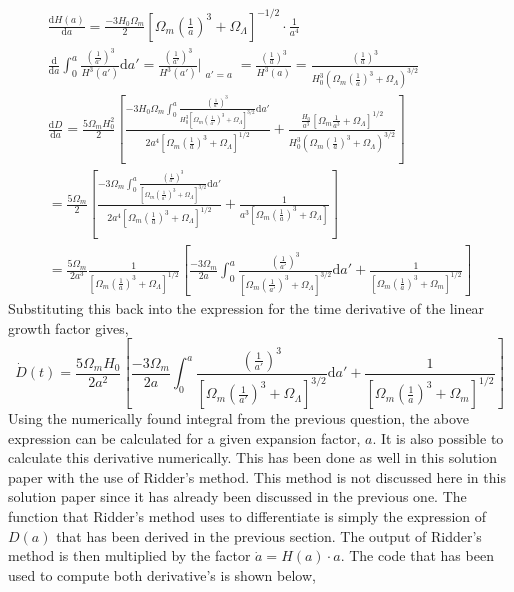 \begin{gather*}
\frac{\mathrm{d}H(a)}{\mathrm{d}a} = \frac{-3H_0\Omega_m}{2}\left[\Omega_m\left(\frac{1}{a}\right)^3+\Omega_{\Lambda}\right]^{-1/2}\cdot\frac{1}{a^4}\\
\frac{\mathrm{d}}{\mathrm{d}a}\int_0^a\frac{\left(\frac{1}{a'}\right)^3}{H^3(a')}\mathrm{d}a' =  \frac{\left(\frac{1}{a'}\right)^3}{H^3(a')}|_{\substack{a'=a}} = \frac{\left(\frac{1}{a}\right)^3}{H^3(a)} = \frac{\left(\frac{1}{a}\right)^3}{H_0^3(\Omega_m\left(\frac{1}{a}\right)^3 + \Omega_{\Lambda})^{3/2}}\\
\frac{\mathrm{d}D}{\mathrm{d}a} = \frac{5\Omega_m H_0^2}{2} \left[\frac{-3H_0\Omega_m\int_0^a\frac{\left(\frac{1}{a'}\right)^3}{H_0^3\left[\Omega_m\left(\frac{1}{a'}\right)^3 + \Omega_{\Lambda}\right]^{3/2}}\mathrm{d}a'}{2a^4\left[\Omega_m\left(\frac{1}{a}\right)^3 +\Omega_{\Lambda}\right]^{1/2}} + \frac{\frac{H_0}{a^3}\left[\Omega_m \frac{1}{a^3} + \Omega_{\Lambda}\right]^{1/2}}{H_0^3(\Omega_m\left(\frac{1}{a}\right)^3 +\Omega_{\Lambda})^{3/2}}\right]\\
= \frac{5\Omega_m}{2}\left[\frac{-3\Omega_m\int_0^a \frac{\left(\frac{1}{a'}\right)^3}{\left[\Omega_m\left(\frac{1}{a'}\right)^3 + \Omega_{\Lambda}\right]^{3/2}}\mathrm{d}a'}{2a^4\left[\Omega_m\left(\frac{1}{a}\right)^3 + \Omega_{\Lambda}\right]^{1/2}} + \frac{1}{a^3\left[\Omega_{m}\left(\frac{1}{a}\right)^3+\Omega_{\Lambda}\right]}\right]\\
= \frac{5\Omega_m}{2a^3}\frac{1}{\left[\Omega_m\left(\frac{1}{a}\right)^3+\Omega_{\Lambda}\right]^{1/2}}\left[\frac{-3\Omega_m}{2a}\int_0^a \frac{\left(\frac{1}{a'}\right)^3}{\left[\Omega_m\left(\frac{1}{a'}\right)^3+\Omega_{\Lambda}\right]^{3/2}}\mathrm{d}a' + \frac{1}{\left[\Omega_m\left(\frac{1}{a}\right)^3+\Omega_m\right]^{1/2}}\right]
\end{gather*}
Substituting this back into the expression for the time derivative of the linear growth factor gives,
\begin{equation}
\dot{D}(t) = \frac{5\Omega_m H_0}{2a^2}\left[\frac{-3\Omega_m}{2a}\int_0^a \frac{\left(\frac{1}{a'}\right)^3}{\left[\Omega_m\left(\frac{1}{a'}\right)^3+\Omega_{\Lambda}\right]^{3/2}}\mathrm{d}a' + \frac{1}{\left[\Omega_m\left(\frac{1}{a}\right)^3+\Omega_m\right]^{1/2}}\right]
\end{equation}
Using the numerically found integral from the previous question, the above expression can be calculated for a given expansion factor, $a$. It is also possible to calculate this derivative numerically. This has been done as well in this solution paper with the use of Ridder's method. This method is not discussed here in this solution paper since it has already been discussed in the previous one. The function that Ridder's method uses to differentiate is simply the expression of $D(a)$ that has been derived in the previous section. The output of Ridder's method is then multiplied by the factor $\dot{a} = H(a)\cdot a$. The code that has been used to compute both derivative's is shown below,

